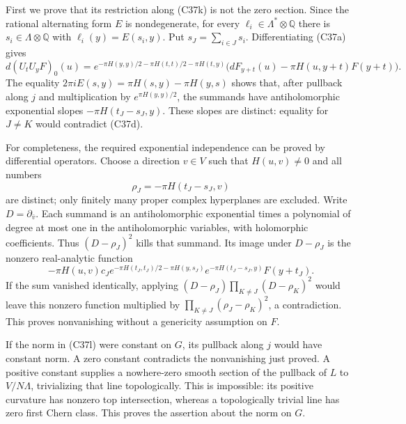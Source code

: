 \documentclass[11pt]{article}
\newcommand{\Q}{\mathbb Q}\newcommand{\C}{\mathbb C}\newcommand{\Z}{\mathbb Z}\newcommand{\R}{\mathbb R}\newcommand{\A}{\mathbb A}\newcommand{\OO}{\mathcal O}
\theoremstyle{definition}\newtheorem{definition}[theorem]{Definition}\newtheorem{remark}[theorem]{Remark}
\begin{document}
First we prove that its restriction along (C37k) is not the zero
section.  Since the rational alternating form $E$ is
nondegenerate, for every $\ell_i\in\Lambda^*\otimes\Q$ there
is $s_i\in\Lambda\otimes\Q$ with $\ell_i(y)=E(s_i,y)$.
Put $s_J=\sum_{i\in J}s_i$.  Differentiating (C37a) gives
\[
 d(U_tU_yF)_0(u)=
 e^{-\pi H(y,y)/2-\pi H(t,t)/2-\pi H(t,y)}
 \bigl(dF_{y+t}(u)-\pi H(u,y+t)F(y+t)\bigr).
 \tag{C37m}
\]
The equality
$2\pi iE(s,y)=\pi H(s,y)-\pi H(y,s)$ shows that, after
pullback along $j$ and multiplication by $e^{\pi H(y,y)/2}$,
the summands have antiholomorphic exponential slopes
$-\pi H(t_J-s_J,y)$.  These slopes are distinct: equality for
$J\ne K$ would contradict (C37d).

For completeness, the required exponential independence can be
proved by differential operators.  Choose a direction $v\in V$
such that $H(u,v)\ne0$ and all numbers
\[
           \rho_J=-\pi H(t_J-s_J,v)
\]
are distinct; only finitely many proper complex hyperplanes
are excluded.  Write $D=\partial_{\bar v}$.  Each summand is
an antiholomorphic exponential times a polynomial of degree at
most one in the antiholomorphic variables, with holomorphic
coefficients.  Thus $(D-\rho_J)^2$ kills that summand.
Its image under $D-\rho_J$ is the nonzero real-analytic function
\[
 -\pi H(u,v)c_J
 e^{-\pi H(t_J,t_J)/2-\pi H(y,s_J)}
 e^{-\pi H(t_J-s_J,y)}F(y+t_J).
\]
If the sum vanished identically, applying
$(D-\rho_J)\prod_{K\ne J}(D-\rho_K)^2$ would leave this
nonzero function multiplied by
$\prod_{K\ne J}(\rho_J-\rho_K)^2$, a contradiction.
This proves nonvanishing without a genericity assumption on $F$.

If the norm in (C37l) were constant on $G$, its pullback along
$j$ would have constant norm.  A zero constant contradicts the
nonvanishing just proved.  A positive constant supplies a
nowhere-zero smooth section of the pullback of $L$ to
$V/N\Lambda$, trivializing that line topologically.  This is
impossible: its positive curvature has nonzero top intersection,
whereas a topologically trivial line has zero first Chern class.
This proves the assertion about the norm on $G$.
\end{document}
